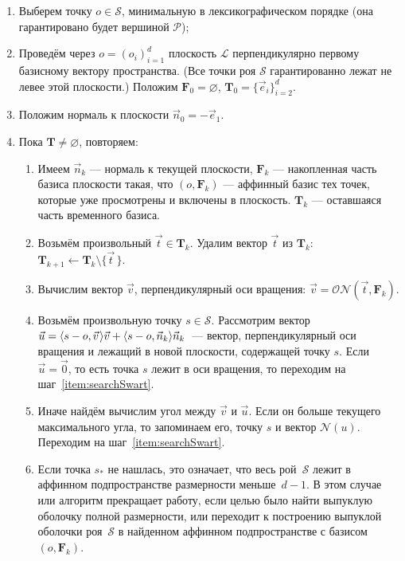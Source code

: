\documentclass[a4paper,12pt]{article}
\newcommand{\Swarm}{\mathcal{S}}              %
\newcommand{\Polytop}{\mathcal{P}}         %
\newcommand{\ZVec}{\vec 0}                    %
\newcommand{\set}[2][]{#1\{ #2 #1\}}                    %
\newcommand{\scalprod}[3][]{#1\langle #2, #3 #1\rangle} %
\newcommand{\Norm}[2][]{\mathcal{N}#1( #2 #1)} %
\newcommand{\ONorm}[3][]{\mathcal{ON}#1( #2, #3 #1)} %
\newcommand{\TempVec}{\mathbf{T}}  %
\newcommand{\FinalVec}{\mathbf{F}} %
\newcommand{\Plane}{\mathcal{L}}           %
\renewcommand{\.}{\hspace{0.2ex}}
\begin{document}
    \begin{enumerate}
      \item Выберем точку $o \in \Swarm$, минимальную в лексикографическом порядке (она гарантировано будет вершиной $\Polytop$);


      \item Проведём через $o=(o_i)_{i = 1}^{d}$ плоскость $\Plane$ перпендикулярно первому базисному вектору пространства. (Все точки роя $\Swarm$ гарантированно лежат не левее этой плоскости.) Положим $\FinalVec_0 = \varnothing$, $\TempVec_0 = \set{\vec e_i}_{i=2}^d$.


      \item Положим нормаль к плоскости $\vec n_0 = -\vec e_1$.


      \item Пока $\TempVec \neq \varnothing$, повторяем:


      \begin{enumerate}
        \item Имеем $\vec n_k$ --- нормаль к текущей плоскости, $\FinalVec_k$ --- накопленная часть базиса плоскости такая, что $(o, \FinalVec_k)$ --- аффинный базис тех точек, которые уже просмотрены и включены в плоскость. $\TempVec_k$ --- оставшаяся часть временного базиса.


        \item Возьмём произвольный $\vec t \in \TempVec_k$. Удалим вектор $\vec t$ из $\TempVec_k$: $\TempVec_{k+1} \leftarrow \TempVec_k \setminus \set{\vec t \,}$.


        \item Вычислим вектор $\vec v$, перпендикулярный оси вращения: $\vec v = \ONorm{\vec t}{\FinalVec_k}$.


        \item Возьмём произвольную точку $s \in \Swarm$. Рассмотрим вектор $\vec u = \scalprod{s - o}{\vec v \.}\vec v + \scalprod{s - o}{\vec n_k}\vec n_k$~--- вектор, перпендикулярный оси вращения и лежащий в новой плоскости, содержащей точку $s$. Если $\vec u = \ZVec$, то есть точка $s$ лежит в оси вращения, то переходим на шаг~\ref{item:searchSwart}.
        \label{item:searchSwart}


        \item Иначе найдём вычислим угол между $\vec v$ и $\vec u$. Если он больше текущего максимального угла, то запоминаем его, точку $s$ и вектор $\Norm{u}$. Переходим на шаг~\ref{item:searchSwart}.


        \item Если точка $s_*$ не нашлась, это означает, что весь рой~$\Swarm$ лежит в аффинном подпространстве размерности меньше~$d-1$. В этом случае или алгоритм прекращает работу, если целью было найти выпуклую оболочку полной размерности, или переходит к построению выпуклой оболочки роя~$\Swarm$ в найденном аффинном подпространстве с базисом $(o, \FinalVec_k)$.
        \label{item:stopSwart}



\end{enumerate}
\end{enumerate}
\end{document}
